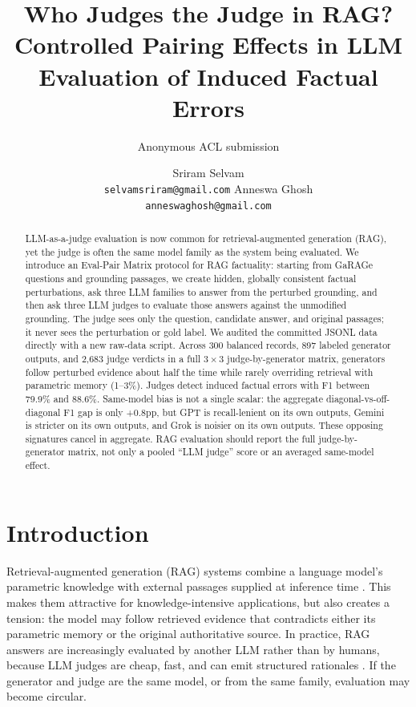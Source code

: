 \documentclass[11pt]{article}
\title{Who Judges the Judge in RAG?\\ Controlled Pairing Effects in LLM Evaluation of Induced Factual Errors}
\author{Anonymous ACL submission}
\author{Sriram Selvam\\
    \texttt{selvamsriram@gmail.com}
    \And
    Anneswa Ghosh\\
    \texttt{anneswaghosh@gmail.com}}
\newcommand{\method}{Eval-Pair Matrix\xspace}
\newcommand{\pp}{\ensuremath{\mathrm{pp}}\xspace}
\begin{document}
\maketitle

\begin{abstract}
LLM-as-a-judge evaluation is now common for retrieval-augmented generation (RAG), yet the judge is often the same model family as the system being evaluated. We introduce an \method protocol for RAG factuality: starting from GaRAGe questions and grounding passages, we create hidden, globally consistent factual perturbations, ask three LLM families to answer from the perturbed grounding, and then ask three LLM judges to evaluate those answers against the unmodified grounding. The judge sees only the question, candidate answer, and original passages; it never sees the perturbation or gold label. We audited the committed JSONL data directly with a new raw-data script. Across 300 balanced records, 897 labeled generator outputs, and 2,683 judge verdicts in a full $3\times3$ judge-by-generator matrix, generators follow perturbed evidence about half the time while rarely overriding retrieval with parametric memory (1--3\%). Judges detect induced factual errors with F1 between 79.9\% and 88.6\%. Same-model bias is not a single scalar: the aggregate diagonal-vs-off-diagonal F1 gap is only +0.8\pp, but GPT is recall-lenient on its own outputs, Gemini is stricter on its own outputs, and Grok is noisier on its own outputs. These opposing signatures cancel in aggregate. RAG evaluation should report the full judge-by-generator matrix, not only a pooled ``LLM judge'' score or an averaged same-model effect.
\end{abstract}

\section{Introduction}

Retrieval-augmented generation (RAG) systems combine a language model's parametric knowledge with external passages supplied at inference time \citep{lewis2020rag}. This makes them attractive for knowledge-intensive applications, but also creates a tension: the model may follow retrieved evidence that contradicts either its parametric memory or the original authoritative source. In practice, RAG answers are increasingly evaluated by another LLM rather than by humans, because LLM judges are cheap, fast, and can emit structured rationales \citep{liu2023geval,zheng2023judging,kim2023prometheus}. If the generator and judge are the same model, or from the same family, evaluation may become circular.
\end{document}
